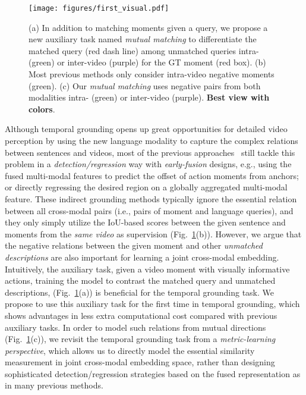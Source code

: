 \documentclass[letterpaper]{article} \usepackage{aaai22}  \usepackage{times}  \usepackage{helvet}  \usepackage{courier}  \usepackage[hyphens]{url}  \usepackage{graphicx} \urlstyle{rm} \def\UrlFont{\rm}  \usepackage{natbib}  \usepackage{caption} \DeclareCaptionStyle{ruled}{labelfont=normalfont,labelsep=colon,strut=off} \frenchspacing  \setlength{\pdfpagewidth}{8.5in}  \setlength{\pdfpageheight}{11in}  \usepackage{algorithm}
\newcommand{\figFIRST}{
    \begin{figure}[t]
        \begin{center}
        \texttt{[image: figures/first\_visual.pdf]}
        \end{center}
        \caption{(a) In addition to matching moments given a query, we propose a new auxiliary task named {\em mutual matching} to differentiate the matched query (red dash line) among unmatched queries intra- (green) or inter-video (purple) for the GT moment (red box). (b) Most previous methods only consider intra-video negative moments (green). (c) Our {\em mutual matching} uses negative pairs from both modalities intra- (green) or inter-video (purple). {\bf Best view with colors}.}
        \label{fig:first}
\end{figure}
        
}
\begin{document}
\figFIRST
Although temporal grounding opens up great opportunities for detailed video perception by using the new language modality to capture the complex relations between sentences and videos, most of the previous approaches~\cite{DBLP:conf/cvpr/ZhangDWWD19,DBLP:conf/nips/YuanMWL019,DBLP:conf/aaai/ZhangPFL20,DBLP:conf/cvpr/ZengXHCTG20,DBLP:journals/corr/abs-2011-05049} still tackle this problem in a {\em detection/regression} way with {\em early-fusion} designs, e.g., using the fused multi-modal features to predict the offset of action moments from anchors; or directly regressing the desired region on a globally aggregated multi-modal feature. These indirect grounding methods typically ignore the essential relation between all cross-modal pairs (i.e., pairs of moment and language queries), and they only simply utilize the IoU-based scores between the given sentence and moments from the {\em same video} as supervision (Fig.~\ref{fig:first}(b)). However, we argue that the negative relations between the given moment and other {\em unmatched descriptions} are also important for learning a joint cross-modal embedding. Intuitively, the auxiliary task, given a video moment with visually informative actions, training the model to contrast the matched query and unmatched descriptions, (Fig.~\ref{fig:first}(a)) is beneficial for the temporal grounding task. We propose to use this auxiliary task for the first time in temporal grounding, which shows advantages in less extra computational cost compared with previous auxiliary tasks. In order to model such relations from mutual directions (Fig.~\ref{fig:first}(c)), we revisit the temporal grounding task from a {\em metric-learning perspective}, which allows us to directly model the essential similarity measurement in joint cross-modal embedding space, rather than designing sophisticated detection/regression strategies based on the fused representation as in many previous methods.  
\end{document}
